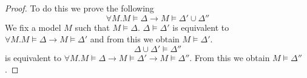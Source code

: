 \begin{mytheorem}
\begin{proof}
%
%
%
%
To do this we prove the following
$$\forall M. M \models \Delta \to M \models \Delta' \cup \Delta''$$
We fix a model $M$ such that $M \models \Delta$. $\Delta \models \Delta'$ is equivalent to $\forall M. M \models \Delta \to M \models \Delta'$ and from this we obtain $M \models \Delta'$. $$\Delta \cup \Delta' \models \Delta''$$ is equivalent to $\forall M. M \models \Delta \to M \models \Delta' \to M \models \Delta''$. From this we obtain $M \models \Delta''$.
\end{proof}
%
\end{mytheorem}
